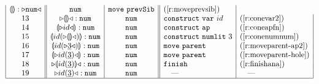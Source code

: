 \begin{figure*}[t!]
\[\begin{array}{|c||c|c||l|l|}
\hhole{} : \zwsel{\tnum{}} &
\tnum &
\aMove{\dPrev{}} & 
\text{(\ref{r:moveprevsib})}
\\
13 &
\zwsel{\hhole{}} : \tnum{} &
\tnum & 
\aConstruct{ \fvar{id}} & 
\text{(\ref{r:conevar2})}
\\
14 &
\hhole{\zwsel{{\textrm{$id$}}}} : \tnum{} &
\tnum & 
\aConstruct{\fap{}} & 
\text{(\ref{r:coneapfn})}
\\
15 &
\hhole{\hap{{{\textrm{$id$}}}}{\zwsel{\hhole{}}}} : \tnum{} &
\tnum & 
\aConstruct{\fnumlit{3}} &  
\text{(\ref{r:conenumnum})}
\\
16 &
\hhole{\hap{{{\textrm{$id$}}}}{\zwsel{\hnum{3}}}} : \tnum{} &
\tnum & 
\aMove{\dParent{}} &  
\text{(\ref{r:moveparent-ap2})}
\\
17 &
\hhole{\zwsel{\hap{{{\textrm{$id$}}}}{{\hnum{3}}}}} : \tnum{} &
\tnum & 
\aMove{\dParent{}} &  
\text{(\ref{r:moveparent-hole})}
\\
18 &
\zwsel{\hhole{{\hap{{{\textrm{$id$}}}}{{\hnum{3}}}}}} : \tnum{} &
\tnum & 
\aFinish &  
\text{(\ref{r:finishana})}
\\
19 &
\zwsel{{{\hap{{{\textrm{$id$}}}}{{\hnum{3}}}}}} : \tnum{} &
\tnum & 
\quad\textrm{---} & 
\quad\textrm{---}
\\
\hline


\end{array}\]
\end{figure*}
